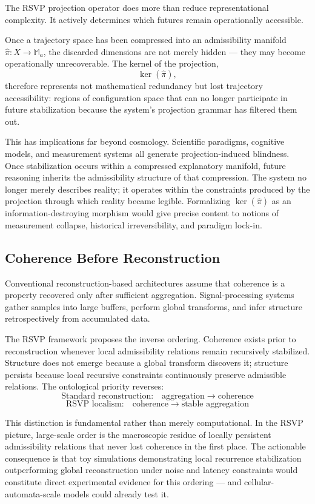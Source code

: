 \documentclass[12pt, a4paper]{article}
\newcommand{\proj}{\hat{\pi}}
\newcommand{\Madm}{\mathbb{M}_{a}}
\newcommand{\Xtraj}{X}
\begin{document}
The RSVP projection operator does more than reduce representational
complexity. It actively determines which futures remain operationally
accessible.

Once a trajectory space has been compressed into an admissibility manifold
\(\proj : \Xtraj \to \Madm\), the discarded dimensions are not merely
hidden — they may become operationally unrecoverable. The kernel of the
projection,
\[
\ker(\proj),
\]
therefore represents not mathematical redundancy but lost trajectory
accessibility: regions of configuration space that can no longer participate
in future stabilization because the system's projection grammar has filtered
them out.

This has implications far beyond cosmology. Scientific paradigms, cognitive
models, and measurement systems all generate projection-induced blindness.
Once stabilization occurs within a compressed explanatory manifold, future
reasoning inherits the admissibility structure of that compression. The
system no longer merely describes reality; it operates within the
constraints produced by the projection through which reality became legible.
Formalizing \(\ker(\proj)\) as an information-destroying morphism would give
precise content to notions of measurement collapse, historical
irreversibility, and paradigm lock-in.

\subsection{Coherence Before Reconstruction}

Conventional reconstruction-based architectures assume that coherence is a
property recovered only after sufficient aggregation. Signal-processing
systems gather samples into large buffers, perform global transforms, and
infer structure retrospectively from accumulated data.

The RSVP framework proposes the inverse ordering. Coherence exists prior to
reconstruction whenever local admissibility relations remain recursively
stabilized. Structure does not emerge because a global transform discovers
it; structure persists because local recursive constraints continuously
preserve admissible relations. The ontological priority reverses:
\[
\text{Standard reconstruction:} \quad
\text{aggregation} \;\to\; \text{coherence}
\]
\[
\text{RSVP localism:} \quad
\text{coherence} \;\to\; \text{stable aggregation}
\]

This distinction is fundamental rather than merely computational. In the
RSVP picture, large-scale order is the macroscopic residue of locally
persistent admissibility relations that never lost coherence in the first
place. The actionable consequence is that toy simulations demonstrating
local recurrence stabilization outperforming global reconstruction under
noise and latency constraints would constitute direct experimental evidence
for this ordering — and cellular-automata-scale models could already test
it.
\end{document}
